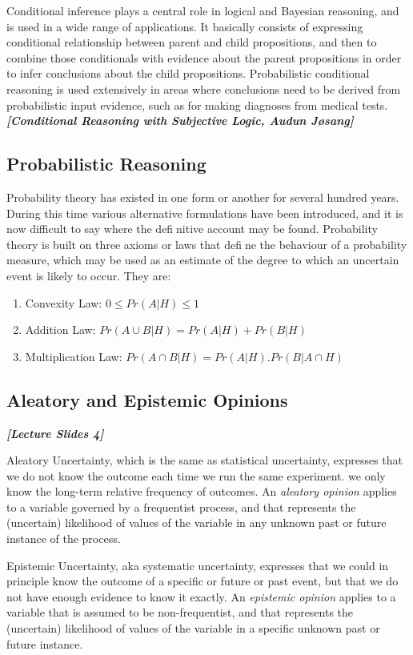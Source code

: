 \documentclass[UTF8]{article}
\newcommand{\mycite}[1]{\textbf{\textit{#1}}}
\begin{document}
Conditional inference plays a central role in logical and Bayesian
reasoning, and is used in a wide range of applications. It basically consists of expressing conditional relationship between
parent and child propositions, and then to combine those conditionals with evidence about the parent propositions in order to
infer conclusions about the child propositions. Probabilistic conditional reasoning is used extensively in areas where conclusions need to be derived from probabilistic input evidence, such as for making
diagnoses from medical tests. \mycite{[Conditional Reasoning with Subjective Logic, Audun Jøsang]}

\subsection{Probabilistic Reasoning}
Probability theory has existed in one form or another for several hundred years.
During this time various alternative formulations have been introduced, and it 
is now difficult to say where the definitive account may be found. Probability theory is built on three axioms or laws that define the behaviour of a probability measure, which may be
used as an estimate of the degree to which an uncertain event is likely to occur. They are:
\begin{enumerate}[i]
    \item {Convexity Law: $0 \leq Pr(A | H) \leq 1$}
    \item {Addition Law: $Pr(A \cup B |  H) = Pr(A | H) + Pr(B | H)$}
    \item {Multiplication Law: $Pr(A \cap B | H) = Pr(A | H) . Pr(B | A \cap H)$}
\end{enumerate}
\subsection{Aleatory and Epistemic Opinions}

\mycite{[Lecture Slides 4]}

Aleatory Uncertainty, which is the same as statistical uncertainty, expresses that we do not know the outcome each time we run the same experiment. we only know the long-term relative frequency of outcomes. An \textit{aleatory opinion} applies to a variable governed by a frequentist process, and that represents the (uncertain) likelihood of values of the variable in any unknown past or future instance of the process. 

Epistemic Uncertainty, aka systematic uncertainty, expresses that we could in principle know the outcome of a specific or future or past event, but that we do not have enough evidence to know it exactly. An \textit{epistemic opinion} applies to a variable that is assumed to be non-frequentist, and that represents the (uncertain) likelihood of values of the variable in a specific unknown past or future instance. 
\end{document}

